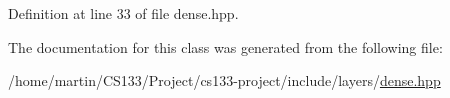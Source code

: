 Definition at line 33 of file dense.\+hpp.



The documentation for this class was generated from the following file\+:\begin{DoxyCompactItemize}
\item 
/home/martin/\+C\+S133/\+Project/cs133-\/project/include/layers/\hyperlink{_dense_8hpp}{dense.\+hpp}\end{DoxyCompactItemize}
